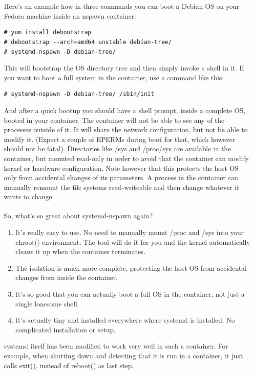 \documentclass[titlepage]{article}
\begin{document}
\\
\\
Here's an example how in three commands you can boot a Debian OS on your Fedora machine inside an nspawn container:
\begin{lstlisting}
# yum install debootstrap
# debootstrap --arch=amd64 unstable debian-tree/
# systemd-nspawn -D debian-tree/
\end{lstlisting}
This will bootstrap the OS directory tree and then simply invoke a shell in it. If you want to boot a full system in the container, use a command like this:
\begin{lstlisting}
# systemd-nspawn -D debian-tree/ /sbin/init
\end{lstlisting}
And after a quick bootup you should have a shell prompt, inside a complete OS, booted in your container. The container will not be able to see any of the processes outside of it. It will share the network configuration, but not be able to modify it. (Expect a couple of EPERMs during boot for that, which however should not be fatal). Directories like /sys and /proc/sys are available in the container, but mounted read-only in order to avoid that the container can modify kernel or hardware configuration. Note however that this protects the host OS only from accidental changes of its parameters. A process in the container can manually remount the file systems read-writeable and then change whatever it wants to change.
\\
\\
So, what's so great about systemd-nspawn again?
\begin{enumerate}
\item
It's really easy to use. No need to manually mount /proc and /sys into your chroot() environment. The tool will do it for you and the kernel automatically cleans it up when the container terminates.
\item
The isolation is much more complete, protecting the host OS from accidental changes from inside the container.
\item
It's so good that you can actually boot a full OS in the container, not just a single lonesome shell.
\item
It's actually tiny and installed everywhere where systemd is installed. No complicated installation or setup.
\end{enumerate}
systemd itself has been modified to work very well in such a container. For example, when shutting down and detecting that it is run in a container, it just calls exit(), instead of reboot() as last step.
\end{document}
